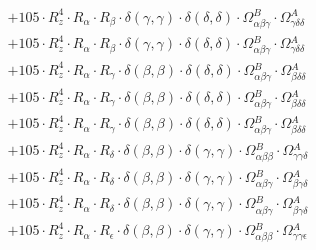 \documentclass{article}
\begin{document}
\begin{subequations}
\begin{gather}
\begin{array}{c}
 \\[0.2em] 		 + 105 \cdot R_{z}^{4} \cdot R_{\alpha{}} \cdot R_{\beta{}} \cdot \delta{}\left(\gamma{}, \gamma{}\right) \cdot \delta{}\left(\delta{}, \delta{}\right) \cdot \Omega{}^{B}_{\alpha{}\beta{}\gamma{}} \cdot \Omega{}^{A}_{\gamma{}\delta{}\delta{}} 
 \\[0.2em] 		 + 105 \cdot R_{z}^{4} \cdot R_{\alpha{}} \cdot R_{\beta{}} \cdot \delta{}\left(\gamma{}, \gamma{}\right) \cdot \delta{}\left(\delta{}, \delta{}\right) \cdot \Omega{}^{B}_{\alpha{}\beta{}\gamma{}} \cdot \Omega{}^{A}_{\gamma{}\delta{}\delta{}} 
 \\[0.2em] 		 + 105 \cdot R_{z}^{4} \cdot R_{\alpha{}} \cdot R_{\gamma{}} \cdot \delta{}\left(\beta{}, \beta{}\right) \cdot \delta{}\left(\delta{}, \delta{}\right) \cdot \Omega{}^{B}_{\alpha{}\beta{}\gamma{}} \cdot \Omega{}^{A}_{\beta{}\delta{}\delta{}} 
 \\[0.2em] 		 + 105 \cdot R_{z}^{4} \cdot R_{\alpha{}} \cdot R_{\gamma{}} \cdot \delta{}\left(\beta{}, \beta{}\right) \cdot \delta{}\left(\delta{}, \delta{}\right) \cdot \Omega{}^{B}_{\alpha{}\beta{}\gamma{}} \cdot \Omega{}^{A}_{\beta{}\delta{}\delta{}} 
 \\[0.2em] 		 + 105 \cdot R_{z}^{4} \cdot R_{\alpha{}} \cdot R_{\gamma{}} \cdot \delta{}\left(\beta{}, \beta{}\right) \cdot \delta{}\left(\delta{}, \delta{}\right) \cdot \Omega{}^{B}_{\alpha{}\beta{}\gamma{}} \cdot \Omega{}^{A}_{\beta{}\delta{}\delta{}} 
 \\[0.2em] 		 + 105 \cdot R_{z}^{4} \cdot R_{\alpha{}} \cdot R_{\delta{}} \cdot \delta{}\left(\beta{}, \beta{}\right) \cdot \delta{}\left(\gamma{}, \gamma{}\right) \cdot \Omega{}^{B}_{\alpha{}\beta{}\beta{}} \cdot \Omega{}^{A}_{\gamma{}\gamma{}\delta{}} 
 \\[0.2em] 		 + 105 \cdot R_{z}^{4} \cdot R_{\alpha{}} \cdot R_{\delta{}} \cdot \delta{}\left(\beta{}, \beta{}\right) \cdot \delta{}\left(\gamma{}, \gamma{}\right) \cdot \Omega{}^{B}_{\alpha{}\beta{}\gamma{}} \cdot \Omega{}^{A}_{\beta{}\gamma{}\delta{}} 
 \\[0.2em] 		 + 105 \cdot R_{z}^{4} \cdot R_{\alpha{}} \cdot R_{\delta{}} \cdot \delta{}\left(\beta{}, \beta{}\right) \cdot \delta{}\left(\gamma{}, \gamma{}\right) \cdot \Omega{}^{B}_{\alpha{}\beta{}\gamma{}} \cdot \Omega{}^{A}_{\beta{}\gamma{}\delta{}} 
 \\[0.2em] 		 + 105 \cdot R_{z}^{4} \cdot R_{\alpha{}} \cdot R_{\epsilon{}} \cdot \delta{}\left(\beta{}, \beta{}\right) \cdot \delta{}\left(\gamma{}, \gamma{}\right) \cdot \Omega{}^{B}_{\alpha{}\beta{}\beta{}} \cdot \Omega{}^{A}_{\gamma{}\gamma{}\epsilon{}} 

\end{array}
\end{gather}
\end{subequations}
\end{document}
